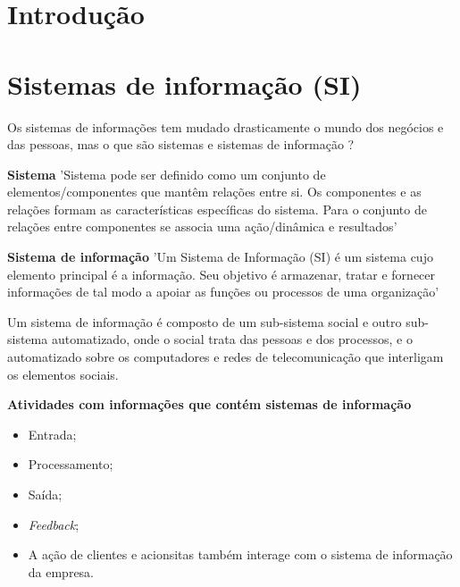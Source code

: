 \documentclass[
	12pt,				%
	openany,			%
	a4paper,			%
	chapter=TITLE,		%
	section=TITLE,		%
	english,
	brazil				%
]{abntex2}
\begin{document}
\imprimircapa

\imprimirfolhaderosto

\tableofcontents

\maketitle

\newpage

\chapter{Introdução}


\chapter{Sistemas de informação (SI)}


Os sistemas de informações tem mudado drasticamente o mundo dos negócios e das pessoas, mas o que são sistemas e sistemas de informação ? 

\textbf{Sistema}
	'Sistema pode ser definido como um conjunto de elementos/componentes que mantêm relações entre si. Os componentes e as relações formam as características específicas do sistema. Para o conjunto de relações entre componentes se associa uma ação/dinâmica e resultados'

\textbf{Sistema de informação}
	'Um Sistema de Informação (SI) é um sistema cujo elemento principal é a informação. Seu objetivo é armazenar, tratar e fornecer informações de tal modo a apoiar as funções ou processos de uma organização'

Um sistema de informação é composto de um sub-sistema social e outro sub-sistema automatizado, onde o social trata das pessoas e dos processos, e o automatizado sobre os computadores e redes de telecomunicação que interligam os elementos sociais.

\textbf{Atividades com informações que contém sistemas de informação}
	\begin{itemize}
		\item Entrada;
		\item Processamento;
		\item Saída;
		\item \textit{Feedback};
		\item A ação de clientes e acionsitas também interage com o sistema de informação da empresa.
	\end{itemize}
\end{document}

